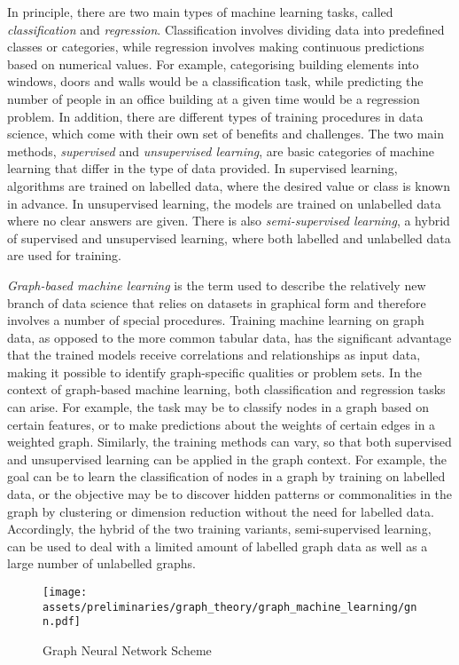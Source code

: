 \documentclass[a4paper, 12pt]{report}
\begin{document}
In principle, there are two main types of machine learning tasks, called \textit{classification} and \textit{regression}. Classification involves dividing data into predefined classes or categories, while regression involves making continuous predictions based on numerical values. For example, categorising building elements into windows, doors and walls would be a classification task, while predicting the number of people in an office building at a given time would be a regression problem. In addition, there are different types of training procedures in data science, which come with their own set of benefits and challenges. The two main methods, \textit{supervised} and \textit{unsupervised learning}, are basic categories of machine learning that differ in the type of data provided. In supervised learning, algorithms are trained on labelled data, where the desired value or class is known in advance. In unsupervised learning, the models are trained on unlabelled data where no clear answers are given. There is also \textit{semi-supervised learning}, a hybrid of supervised and unsupervised learning, where both labelled and unlabelled data are used for training.

\textit{Graph-based machine learning} is the term used to describe the relatively new branch of data science that relies on datasets in graphical form and therefore involves a number of special procedures. Training machine learning on graph data, as opposed to the more common tabular data, has the significant advantage that the trained models receive correlations and relationships as input data, making it possible to identify graph-specific qualities or problem sets. In the context of graph-based machine learning, both classification and regression tasks can arise. For example, the task may be to classify nodes in a graph based on certain features, or to make predictions about the weights of certain edges in a weighted graph. Similarly, the training methods can vary, so that both supervised and unsupervised learning can be applied in the graph context. For example, the goal can be to learn the classification of nodes in a graph by training on labelled data, or the objective may be to discover hidden patterns or commonalities in the graph by clustering or dimension reduction without the need for labelled data. Accordingly, the hybrid of the two training variants, semi-supervised learning, can be used to deal with a limited amount of labelled graph data as well as a large number of unlabelled graphs.

\begin{figure}
\centering
\texttt{[image: assets/preliminaries/graph\_theory/graph\_machine\_learning/gnn.pdf]}
\caption{Graph Neural Network Scheme}
\label{fig:graph-neural-network-scheme}
\end{figure}
\end{document}
